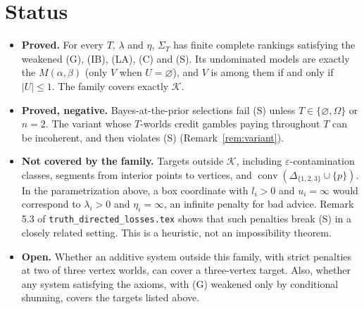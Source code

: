 \documentclass[11pt]{article}
\theoremstyle{remark}\newtheorem{remark}[theorem]{Remark}
\newcommand{\K}{\mathcal K}
\newcommand{\conv}{\operatorname{conv}}
\begin{document}
\section{Status}

\begin{itemize}[leftmargin=*,itemsep=3pt]
\item \textbf{Proved.} For every $T$, $\lambda$ and $\eta$, $\Sigma_T$ has
finite complete rankings satisfying the weakened (G), (IB), (LA), (C) and
(S). Its undominated models are exactly the $M(\alpha,\beta)$ (only $V$
when $U=\varnothing$), and $V$ is among them if and only if $|U|\le1$. The family covers exactly $\K$.
\item \textbf{Proved, negative.} Bayes-at-the-prior selections fail (S)
unless $T\in\{\varnothing,\Omega\}$ or $n=2$. The variant whose
$T$-worlds credit gambles paying throughout $T$ can be incoherent, and
then violates (S) (Remark~\ref{rem:variant}).
\item \textbf{Not covered by the family.} Targets outside $\K$, including
$\varepsilon$-contamination classes, segments from interior points to
vertices, and $\conv(\Delta_{\{1,2,3\}}\cup\{p\})$. In the parametrization
above, a box coordinate with $l_i>0$ and $u_i=\infty$ would correspond to
$\lambda_i>0$ and $\eta_i=\infty$, an infinite penalty for bad advice.
Remark 5.3 of \texttt{truth\_\allowbreak directed\_\allowbreak losses.tex} shows that such
penalties break (S) in a closely related setting. This is a heuristic, not
an impossibility theorem.
\item \textbf{Open.} Whether an additive system outside this family, with
strict penalties at two of three vertex worlds, can cover a three-vertex
target. Also, whether any system satisfying the axioms, with (G) weakened
only by conditional shunning, covers the targets listed above.
\end{itemize}
\end{document}
